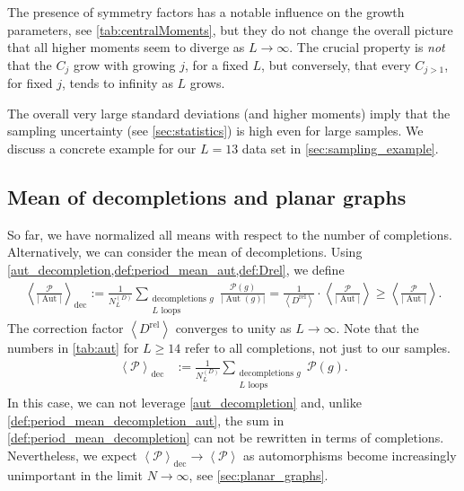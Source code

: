 \documentclass[11pt,a4paper]{article}
\newcommand{\abs}[1]{\lvert #1 \rvert}
\newcommand{\period}{\mathcal P}
\newcommand{\Aut}{\operatorname{Aut}}
\renewcommand{\|}{\rule[-0.4ex]{0.2ex}{1.2em}}
\begin{document}
The presence of symmetry factors has a notable influence on the growth parameters, see \cref{tab:centralMoments}, but they do not change the overall picture that all higher moments seem to diverge as $L\rightarrow \infty$. 
The crucial property is \emph{not} that the $C_j$ grow with growing $j$, for a fixed $L$, but conversely, that every $C_{j>1}$, for fixed $j$, tends to infinity as $L$ grows.

The overall very large standard deviations (and higher moments) imply that the sampling uncertainty (see \cref{sec:statistics}) is high even for large samples. We discuss a concrete example for our $L=13$ data set in \cref{sec:sampling_example}.

\subsection{Mean of decompletions and planar graphs}\label{sec:mean_decompletions}

So far, we have normalized all means with respect to the number of completions. Alternatively, we can consider the mean of decompletions. Using \cref{aut_decompletion,def:period_mean_aut,def:Drel}, we define 
\begin{align}\label{def:period_mean_decompletion_aut}
\left \langle \frac{\period  }{\abs{\Aut }} \right \rangle _\text{dec} := \frac{1}{  N^{(D)}_L  } \sum_{\substack{ \text{decompletions }g \\ L \text{ loops} }} \frac{\period (g)}{\abs{\Aut (g)}} = 	\frac 1 {\left \langle D^\text{rel}\right \rangle} \cdot \left \langle \frac{\period}{\abs{\Aut}}  \right \rangle \geq \left \langle \frac{\period}{\abs{\Aut}}  \right \rangle .
\end{align}
The correction factor $\left \langle D^\text{rel} \right \rangle $ converges to unity as $L \rightarrow \infty$. Note that the numbers in  \cref{tab:aut} for $L \geq 14$ refer to all completions, not just to our samples. 
\begin{align}\label{def:period_mean_decompletion}
	\left \langle \period    \right \rangle _\text{dec} &:= \frac{1}{  N^{(D)}_L  } \sum_{\substack{ \text{decompletions }g \\ L \text{ loops} }}  \period (g) .
\end{align}
In this case, we can not leverage \cref{aut_decompletion} and, unlike \cref{def:period_mean_decompletion_aut}, the sum in \cref{def:period_mean_decompletion} can not be rewritten in terms of completions. Nevertheless, we expect $\left \langle \period \right \rangle_\text{dec} \rightarrow \left \langle \period \right \rangle $ as automorphisms become increasingly unimportant in the limit $N \rightarrow \infty$, see \cref{sec:planar_graphs}.
\end{document}
